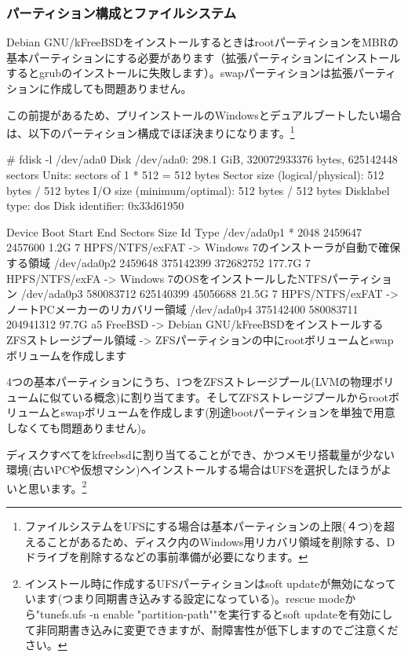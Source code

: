 \documentclass[mingoth,a4paper]{jsarticle}
\begin{document}
\subsubsection{パーティション構成とファイルシステム}

Debian GNU/kFreeBSDをインストールするときはrootパーティションをMBRの基本パーティションにする必要があります（拡張パーティションにインストールするとgrubのインストールに失敗します）。swapパーティションは拡張パーティションに作成しても問題ありません。

この前提があるため、プリインストールのWindowsとデュアルブートしたい場合は、以下のパーティション構成でほぼ決まりになります。\footnote{ファイルシステムをUFSにする場合は基本パーティションの上限(４つ)を超えることがあるため、ディスク内のWindows用リカバリ領域を削除する、Dドライブを削除するなどの事前準備が必要になります。}

\begin{commandline}
# fdisk -l /dev/ada0
Disk /dev/ada0: 298.1 GiB, 320072933376 bytes, 625142448 sectors
Units: sectors of 1 * 512 = 512 bytes
Sector size (logical/physical): 512 bytes / 512 bytes
I/O size (minimum/optimal): 512 bytes / 512 bytes
Disklabel type: dos
Disk identifier: 0x33d61950

Device      Boot     Start       End   Sectors   Size Id Type
/dev/ada0p1 *         2048   2459647   2457600   1.2G  7 HPFS/NTFS/exFAT
  -> Windows 7のインストーラが自動で確保する領域
/dev/ada0p2        2459648 375142399 372682752 177.7G  7 HPFS/NTFS/exFA
  -> Windows 7のOSをインストールしたNTFSパーティション
/dev/ada0p3      580083712 625140399  45056688  21.5G  7 HPFS/NTFS/exFAT
  -> ノートPCメーカーのリカバリー領域
/dev/ada0p4      375142400 580083711 204941312  97.7G a5 FreeBSD
  -> Debian GNU/kFreeBSDをインストールするZFSストレージプール領域
  -> ZFSパーティションの中にrootボリュームとswapボリュームを作成します
\end{commandline}

4つの基本パーティションにうち、1つをZFSストレージプール(LVMの物理ボリュームに似ている概念)に割り当てます。そしてZFSストレージプールからrootボリュームとswapボリュームを作成します(別途bootパーティションを単独で用意しなくても問題ありません)。

ディスクすべてをkfreebsdに割り当てることができ、かつメモリ搭載量が少ない環境(古いPCや仮想マシン)へインストールする場合はUFSを選択したほうがよいと思います。\footnote{インストール時に作成するUFSパーティションはsoft updateが無効になっています(つまり同期書き込みする設定になっている)。rescue modeから"tunefs.ufs -n enable "partition-path""を実行するとsoft updateを有効にして非同期書き込みに変更できますが、耐障害性が低下しますのでご注意ください。}
\end{document}
